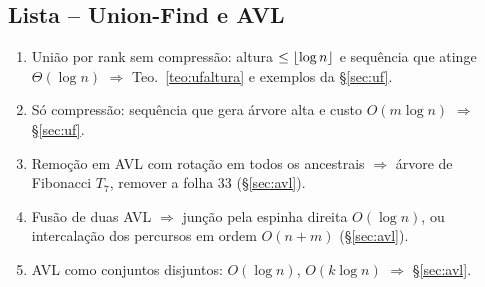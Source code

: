 \subsection{Lista -- Union-Find e AVL}
\begin{enumerate}
  \item União por rank sem compressão: altura $\le\lfloor\log n\rfloor$ e sequência que atinge $\Theta(\log n)$ $\Rightarrow$ Teo.~\ref{teo:ufaltura} e exemplos da §\ref{sec:uf}.
  \item Só compressão: sequência que gera árvore alta e custo $O(m\log n)$ $\Rightarrow$ §\ref{sec:uf}.
  \item Remoção em AVL com rotação em todos os ancestrais $\Rightarrow$ árvore de Fibonacci $T_7$, remover a folha 33 (§\ref{sec:avl}).
  \item Fusão de duas AVL $\Rightarrow$ junção pela espinha direita $O(\log n)$, ou intercalação dos percursos em ordem $O(n+m)$ (§\ref{sec:avl}).
  \item AVL como conjuntos disjuntos: \Find{} $O(\log n)$, \Union{} $O(k\log n)$ $\Rightarrow$ §\ref{sec:avl}.
\end{enumerate}

